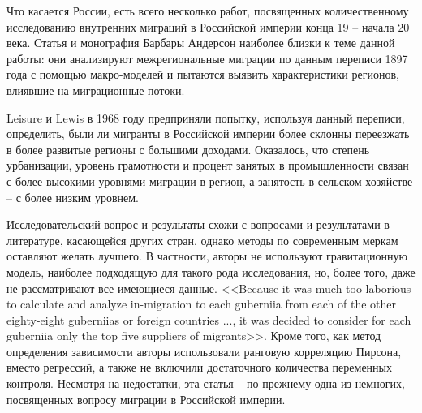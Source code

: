 \documentclass[a4paper,12pt]{article}
\begin{document}

Что касается России, есть всего несколько работ, посвященных количественному исследованию внутренних миграций в Российской империи конца 19 – начала 20 века. Статья \citeauthor{leasure_internal_1968} и монография Барбары Андерсон \citep{anderson_internal_1980} наиболее близки к теме данной работы: они анализируют межрегиональные миграции по данным переписи 1897 года с помощью макро-моделей и пытаются выявить характеристики регионов, влиявшие на миграционные потоки.

Leisure и Lewis в 1968 году предприняли попытку, используя данный переписи, определить, были ли мигранты в Российской империи более склонны переезжать в более развитые регионы с большими доходами. \citep{leasure_internal_1968} Оказалось, что степень урбанизации, уровень грамотности и процент занятых в промышленности связан с более высокими уровнями миграции в регион, а занятость в сельском хозяйстве – с более низким уровнем.


Исследовательский вопрос и результаты схожи с вопросами и результатами в литературе, касающейся других стран, однако методы по современным меркам оставляют желать лучшего. В частности, авторы не используют гравитационную модель, наиболее подходящую для такого рода исследования, но, более того, даже не рассматривают все имеющиеся данные. <<Because it was much too laborious to calculate and analyze in-migration to each guberniia from each of the other eighty-eight guberniias or foreign countries ..., it was decided to consider for each guberniia only the top five suppliers of migrants>>. Кроме того, как метод определения зависимости авторы использовали ранговую корреляцию Пирсона, вместо регрессий, а также не включили достаточного количества переменных контроля. Несмотря на недостатки, эта статья -- по-прежнему одна из немногих, посвященных вопросу миграции в Российской империи.
\end{document}
